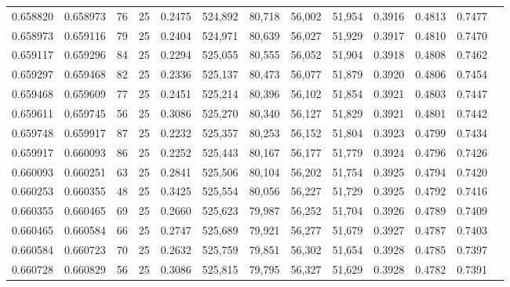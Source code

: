 \begin{tabular}{rrrrrrrrrrrrr}
0.658820 & 0.658973 &    76 &  25 &                                     0.2475 & 524,892 &  80,718 &  56,002 &  51,954 & 0.3916 & 0.4813 & 0.7477 \\
0.658973 & 0.659116 &    79 &  25 &                                     0.2404 & 524,971 &  80,639 &  56,027 &  51,929 & 0.3917 & 0.4810 & 0.7470 \\
0.659117 & 0.659296 &    84 &  25 &                                     0.2294 & 525,055 &  80,555 &  56,052 &  51,904 & 0.3918 & 0.4808 & 0.7462 \\
0.659297 & 0.659468 &    82 &  25 &                                     0.2336 & 525,137 &  80,473 &  56,077 &  51,879 & 0.3920 & 0.4806 & 0.7454 \\
0.659468 & 0.659609 &    77 &  25 &                                     0.2451 & 525,214 &  80,396 &  56,102 &  51,854 & 0.3921 & 0.4803 & 0.7447 \\
0.659611 & 0.659745 &    56 &  25 &                                     0.3086 & 525,270 &  80,340 &  56,127 &  51,829 & 0.3921 & 0.4801 & 0.7442 \\
0.659748 & 0.659917 &    87 &  25 &                                     0.2232 & 525,357 &  80,253 &  56,152 &  51,804 & 0.3923 & 0.4799 & 0.7434 \\
0.659917 & 0.660093 &    86 &  25 &                                     0.2252 & 525,443 &  80,167 &  56,177 &  51,779 & 0.3924 & 0.4796 & 0.7426 \\
0.660093 & 0.660251 &    63 &  25 &                                     0.2841 & 525,506 &  80,104 &  56,202 &  51,754 & 0.3925 & 0.4794 & 0.7420 \\
0.660253 & 0.660355 &    48 &  25 &                                     0.3425 & 525,554 &  80,056 &  56,227 &  51,729 & 0.3925 & 0.4792 & 0.7416 \\
0.660355 & 0.660465 &    69 &  25 &                                     0.2660 & 525,623 &  79,987 &  56,252 &  51,704 & 0.3926 & 0.4789 & 0.7409 \\
0.660465 & 0.660584 &    66 &  25 &                                     0.2747 & 525,689 &  79,921 &  56,277 &  51,679 & 0.3927 & 0.4787 & 0.7403 \\
0.660584 & 0.660723 &    70 &  25 &                                     0.2632 & 525,759 &  79,851 &  56,302 &  51,654 & 0.3928 & 0.4785 & 0.7397 \\
0.660728 & 0.660829 &    56 &  25 &                                     0.3086 & 525,815 &  79,795 &  56,327 &  51,629 & 0.3928 & 0.4782 & 0.7391 \\

\end{tabular}
